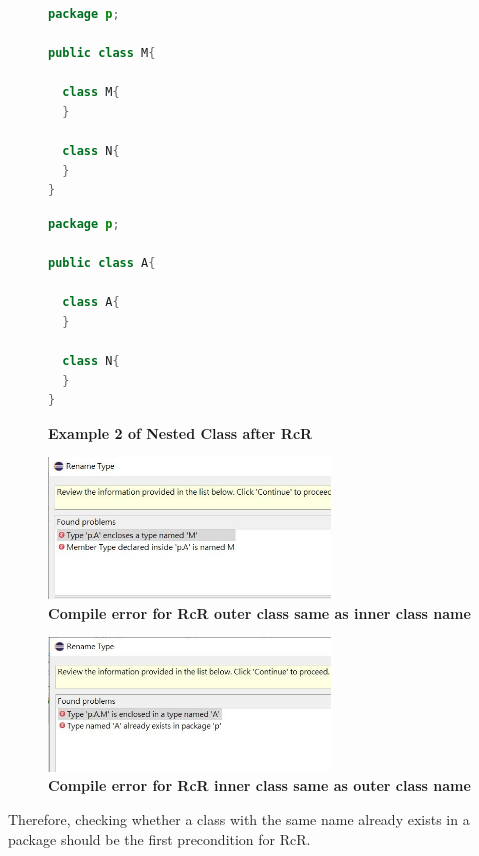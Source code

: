 \begin{figure}[th]
\centering
\begin{minipage}[t]{0.45\linewidth}
\begin{lstlisting}[language=java, basicstyle=\scriptsize\ttfamily,frame=single]
package p;

public class M{	
  
  class M{
  }
	
  class N{
  }
} 
\end{lstlisting}
\end{minipage}
\hfill
\begin{minipage}[t]{0.45\linewidth}
\begin{lstlisting}[language=java, basicstyle=\scriptsize\ttfamily,frame=single]
package p;

public class A{	
    
  class A{
  }
    
  class N{
  }
} 
\end{lstlisting}
\end{minipage}
\caption{\textbf{Example 2 of Nested Class after RcR}}
\label{fig:nestedclass2}
\end{figure}

\begin{figure}[H]
\centerline{\includegraphics[width=75mm,scale=0.4]{NC2.jpg}}
\caption{\textbf{Compile error for RcR outer class same as inner class name}}
\label{fig:NC2}
\end{figure}

\begin{figure}[H]
\centerline{\includegraphics[width=75mm,scale=0.4]{NC3.jpg}}
\caption{\textbf{Compile error for RcR inner class same as outer class name}}
\label{fig:NC3}
\end{figure}

Therefore, checking whether a class with the same name already exists in a package should be the first precondition for RcR. 
   
